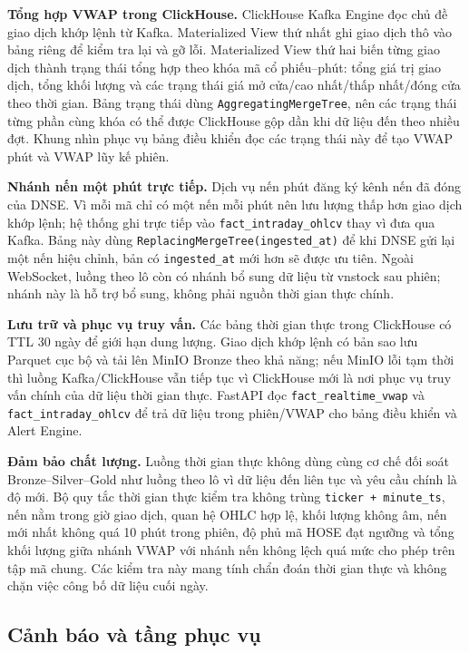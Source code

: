 \documentclass[conference,a4paper]{IEEEtran}
\newcommand{\code}[1]{\texttt{#1}}
\begin{document}
\textbf{Tổng hợp VWAP trong ClickHouse.} ClickHouse Kafka Engine đọc chủ đề giao dịch khớp lệnh từ Kafka. Materialized View thứ nhất ghi giao dịch thô vào bảng riêng để kiểm tra lại và gỡ lỗi. Materialized View thứ hai biến từng giao dịch thành trạng thái tổng hợp theo khóa mã cổ phiếu--phút: tổng giá trị giao dịch, tổng khối lượng và các trạng thái giá mở cửa/cao nhất/thấp nhất/đóng cửa theo thời gian. Bảng trạng thái dùng \code{AggregatingMergeTree}, nên các trạng thái từng phần cùng khóa có thể được ClickHouse gộp dần khi dữ liệu đến theo nhiều đợt. Khung nhìn phục vụ bảng điều khiển đọc các trạng thái này để tạo VWAP phút và VWAP lũy kế phiên.

\textbf{Nhánh nến một phút trực tiếp.} Dịch vụ nến phút đăng ký kênh nến đã đóng của DNSE. Vì mỗi mã chỉ có một nến mỗi phút nên lưu lượng thấp hơn giao dịch khớp lệnh; hệ thống ghi trực tiếp vào \code{fact\_intraday\_ohlcv} thay vì đưa qua Kafka. Bảng này dùng \code{ReplacingMergeTree(ingested\_at)} để khi DNSE gửi lại một nến hiệu chỉnh, bản có \code{ingested\_at} mới hơn sẽ được ưu tiên. Ngoài WebSocket, luồng theo lô còn có nhánh bổ sung dữ liệu từ vnstock sau phiên; nhánh này là hỗ trợ bổ sung, không phải nguồn thời gian thực chính.

\textbf{Lưu trữ và phục vụ truy vấn.} Các bảng thời gian thực trong ClickHouse có TTL 30 ngày để giới hạn dung lượng. Giao dịch khớp lệnh có bản sao lưu Parquet cục bộ và tải lên MinIO Bronze theo khả năng; nếu MinIO lỗi tạm thời thì luồng Kafka/ClickHouse vẫn tiếp tục vì ClickHouse mới là nơi phục vụ truy vấn chính của dữ liệu thời gian thực. FastAPI đọc \code{fact\_realtime\_vwap} và \code{fact\_intraday\_ohlcv} để trả dữ liệu trong phiên/VWAP cho bảng điều khiển và Alert Engine.

\textbf{Đảm bảo chất lượng.} Luồng thời gian thực không dùng cùng cơ chế đối soát Bronze--Silver--Gold như luồng theo lô vì dữ liệu đến liên tục và yêu cầu chính là độ mới. Bộ quy tắc thời gian thực kiểm tra không trùng \code{ticker + minute\_ts}, nến nằm trong giờ giao dịch, quan hệ OHLC hợp lệ, khối lượng không âm, nến mới nhất không quá 10 phút trong phiên, độ phủ mã HOSE đạt ngưỡng và tổng khối lượng giữa nhánh VWAP với nhánh nến không lệch quá mức cho phép trên tập mã chung. Các kiểm tra này mang tính chẩn đoán thời gian thực và không chặn việc công bố dữ liệu cuối ngày.


\subsection{Cảnh báo và tầng phục vụ}
\end{document}

